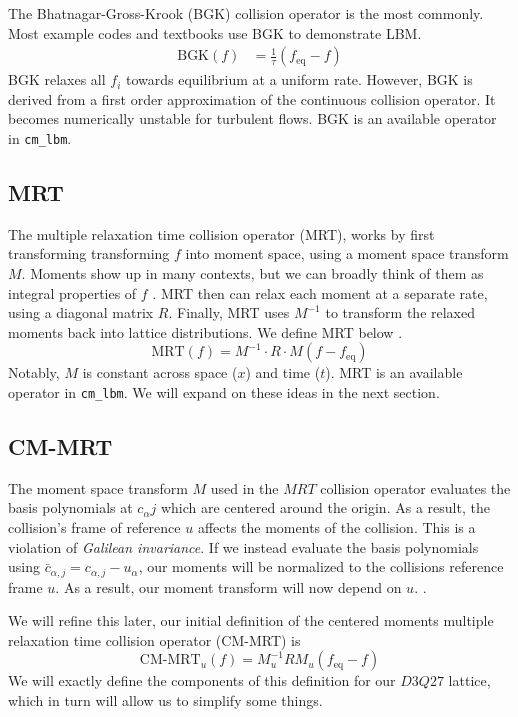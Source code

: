 The Bhatnagar-Gross-Krook (BGK) collision operator
is the most commonly.
Most example codes and textbooks use BGK to demonstrate
LBM.
\begin{align*}
    \text{BGK}(f) &= \frac{1}{\tau} (f_{\text{eq}} - f)
\end{align*}
BGK relaxes all $f_i$ towards equilibrium at a uniform rate.
However, BGK is derived from a first order approximation
of the continuous collision operator.
It becomes numerically unstable for turbulent flows.
BGK is an available operator in \lstinline{cm_lbm}.

\subsection{MRT}

The multiple relaxation time collision operator (MRT),
works by first transforming transforming $f$ into moment space,
using a moment space transform $M$.
Moments show up in many contexts, but we can broadly think of them
as integral properties of $f$ \cite{Taber2018}.
MRT then can relax each moment at a separate rate, using a diagonal matrix $R$.
Finally, MRT uses $M^{-1}$ to transform the relaxed moments
back into lattice distributions. We define MRT below \cite{De2017}.
$$
\text{MRT}(f) = M^{-1} \cdot R \cdot M (f - f_{\text{eq}})
$$
Notably, $M$ is constant across space ($x$) and time ($t$).
MRT is an available operator in \lstinline{cm_lbm}.
We will expand on these ideas in the next section.

\subsection{CM-MRT}\label{sec:cm-mrt}
The moment space transform $M$ used in the $MRT$ collision operator
evaluates the basis polynomials at $c_{\alpha}j$
which are centered around the origin.
As a result, the collision's frame of reference $u$ affects the 
moments of the collision.
This is a violation of \textit{Galilean invariance}.
If we instead evaluate the basis polynomials using 
$\bar{c}_{\alpha,j} = c_{\alpha, j} - u_{\alpha}$,
our moments will be normalized to the collisions reference frame $u$. 
As a result, our moment transform will now depend on $u$. \cite{De2017, De2019}.


We will refine this later, our initial definition of 
the centered moments multiple relaxation time collision operator (CM-MRT) 
is
$$\label{eqn:cm_mrt_def_init}
\text{CM-MRT}_{u}(f) = M_u^{-1} R  M_u(f_{\text{eq}} - f)
$$
We will exactly define the components of this definition for our
$D3Q27$ lattice, which in turn will allow us to simplify some things.

